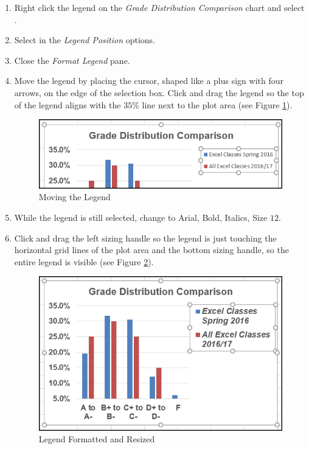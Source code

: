 \begin{enumbox}
	\begin{enumerate}
		\item Right click the legend on the \textit{Grade Distribution Comparison} chart and select .
		\item Select  in the \textit{Legend Position} options. 
		\item Close the \textit{Format Legend} pane.
		\item Move the legend by placing the cursor, shaped like a plus sign with four arrows, on the edge of the selection box. Click and drag the legend so the top of the legend aligns with the $ 35\% $ line next to the plot area (see Figure \ref{04:fig31}).
	
		\begin{figure}[H]
			\centering
			\includegraphics[width=\maxwidth{.95\linewidth}]{gfx/ch04_fig31}
			\caption{Moving the Legend}
			\label{04:fig31}
		\end{figure}
	
		\item While the legend is still selected, change  to Arial, Bold, Italics, Size $ 12 $.
		\item Click and drag the left sizing handle so the legend is just touching the horizontal grid lines of the plot area and the bottom sizing handle, so the entire legend is visible (see Figure \ref{04:fig32}).
	
		\begin{figure}[H]
			\centering
			\includegraphics[width=\maxwidth{.95\linewidth}]{gfx/ch04_fig32}
			\caption{Legend Formatted and Resized}
			\label{04:fig32}
		\end{figure}
	

\end{enumerate}
\end{enumbox}

